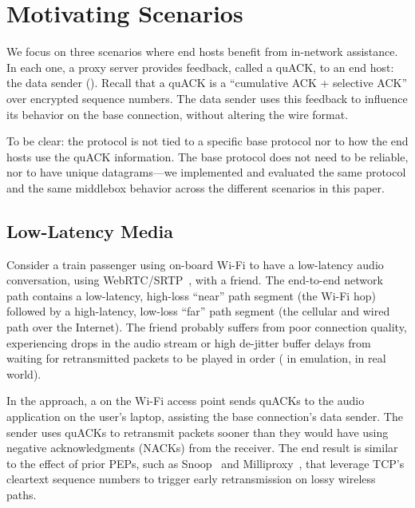 \section{Motivating Scenarios}
\label{sec:motivation}


We focus on three scenarios where end hosts benefit from in-network assistance. In each one, a proxy server provides
feedback, called a quACK, to an end host: the data sender ().
Recall that a quACK is a ``cumulative ACK + selective ACK'' over encrypted sequence numbers.
The data sender uses this feedback to influence its behavior on the base connection, without altering the wire format.

To be clear: the \sys protocol is not tied to a specific base protocol
nor to how the end hosts use the quACK information. The base protocol does not
need to be reliable, nor to have unique datagrams---we implemented and evaluated
the same \sys protocol and the same middlebox behavior across the different
scenarios in this paper.

\subsection{Low-Latency Media}
\label{sec:low-latency-media}

Consider a train passenger using on-board Wi-Fi to have a low-latency audio
conversation, using WebRTC/SRTP~\cite{rfc8834webrtc}, with a friend.
The end-to-end network path contains a low-latency, high-loss ``near'' path
segment (the Wi-Fi hop) followed by a high-latency, low-loss ``far'' path
segment (the cellular and wired path over the Internet).
The friend probably suffers from poor connection quality, experiencing drops in the
audio stream or high de-jitter buffer delays from waiting for retransmitted
packets to be played in order ( in emulation,  in real world).

In the \sys approach, a \sys on the Wi-Fi access point sends quACKs to the audio
application on the user's laptop, assisting the base connection's data sender.
The sender uses quACKs
to retransmit packets sooner than they would have using negative acknowledgments (NACKs) from the receiver.
The end result is similar to the effect of prior PEPs, such as Snoop~\cite{balakrishnan1995snoop}
and Milliproxy~\cite{polese2017milliproxy}, that leverage TCP's cleartext sequence numbers
to trigger early retransmission on lossy wireless paths.

